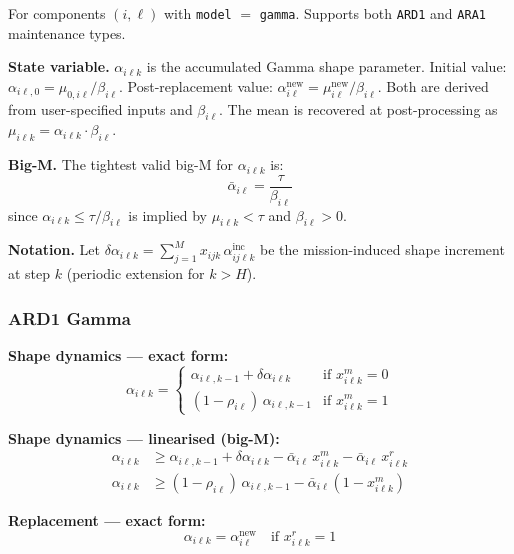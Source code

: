 \documentclass[11pt,a4paper]{article}
\begin{document}
For components $(i,\ell)$ with \texttt{model} $=$ \texttt{gamma}.
Supports both \texttt{ARD1} and \texttt{ARA1} maintenance types.

\textbf{State variable.} $\alpha_{i\ell k}$ is the accumulated Gamma shape parameter.
Initial value: $\alpha_{i\ell,0} = \mu_{0,i\ell}/\beta_{i\ell}$.
Post-replacement value: $\alpha^{\mathrm{new}}_{i\ell} = \mu^{\mathrm{new}}_{i\ell}/\beta_{i\ell}$.
Both are derived from user-specified inputs and $\beta_{i\ell}$.
The mean is recovered at post-processing as $\mu_{i\ell k} = \alpha_{i\ell k}\cdot\beta_{i\ell}$.

\textbf{Big-M.} The tightest valid big-M for $\alpha_{i\ell k}$ is:
\begin{equation}
  \bar{\alpha}_{i\ell} = \frac{\tau}{\beta_{i\ell}}
\end{equation}
since $\alpha_{i\ell k} \leq \tau/\beta_{i\ell}$ is implied by $\mu_{i\ell k} < \tau$ and $\beta_{i\ell} > 0$.

\textbf{Notation.} Let $\delta\alpha_{i\ell k} = \sum_{j=1}^{M} x_{ijk}\,\alpha^{\mathrm{inc}}_{ij\ell k}$
be the mission-induced shape increment at step $k$ (periodic extension for $k > H$).

\subsubsection{ARD1 Gamma}

\textbf{Shape dynamics --- exact form:}
\begin{equation}
  \alpha_{i\ell k} = \begin{cases}
    \alpha_{i\ell,k-1} + \delta\alpha_{i\ell k} & \text{if } x^m_{i\ell k} = 0 \\
    (1-\rho_{i\ell})\,\alpha_{i\ell,k-1} & \text{if } x^m_{i\ell k} = 1
  \end{cases}
\end{equation}

\textbf{Shape dynamics --- linearised (big-M):}
\begin{align}
  \alpha_{i\ell k} &\geq \alpha_{i\ell,k-1} + \delta\alpha_{i\ell k}
    - \bar{\alpha}_{i\ell}\,x^m_{i\ell k}
    - \bar{\alpha}_{i\ell}\,x^r_{i\ell k} \\
  \alpha_{i\ell k} &\geq (1-\rho_{i\ell})\,\alpha_{i\ell,k-1}
    - \bar{\alpha}_{i\ell}(1 - x^m_{i\ell k})
\end{align}

\textbf{Replacement --- exact form:}
\begin{equation}
  \alpha_{i\ell k} = \alpha^{\mathrm{new}}_{i\ell} \quad \text{if } x^r_{i\ell k} = 1
\end{equation}
\end{document}

